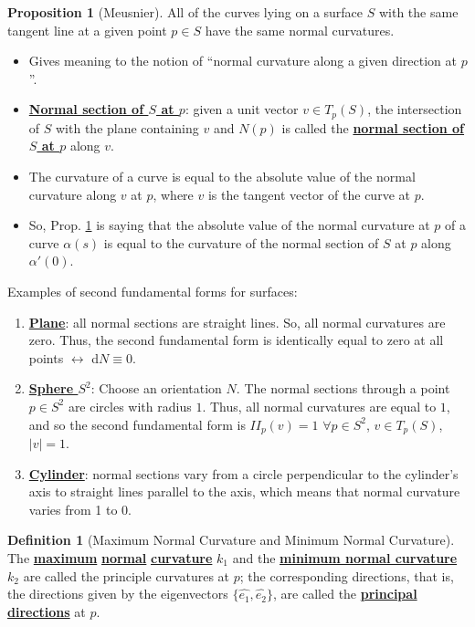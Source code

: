\documentclass[11pt]{scrartcl}
\theoremstyle{definition}
\newtheorem{definition}{Definition}
\newtheorem{prop}{Proposition}
\theoremstyle{remark}
\newcommand{\dfn}[1]{\textbf{\underline{#1}}}
\begin{document}
{\begin{prop}[Meusnier] \label{curve} 
	All of the curves lying on a surface $S$ with the same tangent line at a given point $p \in S$ have the same normal curvatures. 
\end{prop}
\begin{itemize}[noitemsep]
	\item Gives meaning to the notion of ``normal curvature along a given direction at $p$''. 
	\item \dfn{Normal section of $S$ at $p$}: given a unit vector $v \in T_p(S)$, the intersection of $S$ with the plane containing $v$ and $N(p)$ is called the \dfn{normal section of $S$ at $p$} along $v$. 
	\item The curvature of a curve is equal to the absolute value of the normal curvature along $v$ at $p$, where $v$ is the tangent vector of the curve at $p$. 
	\item So, Prop. \ref{curve} is saying that the absolute value of the normal curvature at $p$ of a curve $\alpha(s)$ is equal to the curvature of the normal section of $S$ at $p$ along $\alpha'(0)$. 
\end{itemize}
Examples of second fundamental forms for surfaces: 
\begin{enumerate}[noitemsep]
	\item \dfn{Plane}: all normal sections are straight lines. So, all normal curvatures are zero. Thus, the second fundamental form is identically equal to zero at all points $\leftrightarrow$ d$N \equiv 0$. 
	\item \dfn{Sphere $S^2$}: Choose an orientation $N$. The normal sections through a point $p \in S^2$ are circles with radius $1$. Thus, all normal curvatures are equal to $1$, and so the second fundamental form is $II_p(v) = 1$ $\forall p \in  S^2$, $v \in T_p(S)$, $|v| =1$. 
	\item \dfn{Cylinder}: normal sections vary from a circle perpendicular to the cylinder's axis to straight lines parallel to the axis, which means that normal curvature varies from 1 to 0. 
\end{enumerate}

\begin{definition}[Maximum Normal Curvature and Minimum Normal Curvature]
	The \dfn{maximum} \dfn{normal} \dfn{curvature} $k_1$ and the \dfn{minimum normal curvature} $k_2$ are called the principle curvatures at $p$; the corresponding directions, that is, the directions given by the eigenvectors $\{ \hat{e_1}, \hat{e_2} \}$, are called the \dfn{principal directions} at $p$. 
\end{definition}

}
\end{document}
